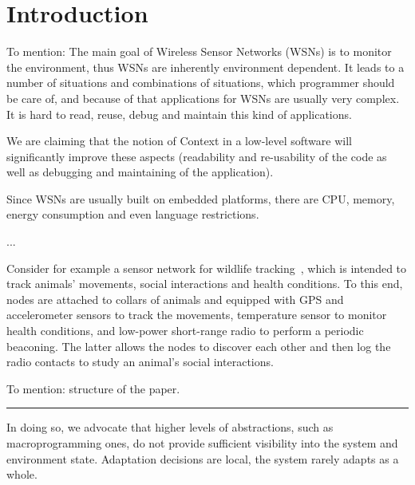 \section{Introduction} To mention: The main goal of Wireless Sensor Networks
(WSNs) is to monitor the environment, thus WSNs are inherently environment
dependent. It leads to a number of situations and combinations of situations,
which programmer should be care of, and because of that applications for WSNs
are usually very complex. It is hard to read, reuse, debug and maintain this
kind of applications.

We are claiming that the notion of Context in a low-level software will
significantly improve these aspects (readability and re-usability of the code
as well as debugging and maintaining of the application).

Since WSNs are usually built on embedded platforms, there are CPU, memory,
energy consumption and even language restrictions.

...

Consider for example a sensor network for wildlife tracking~\cite{pasztor10},
which is intended to track animals' movements, social interactions and health
conditions. To this end, nodes are attached to collars of animals and equipped
with GPS and accelerometer sensors to track the movements, temperature sensor
to monitor health conditions, and low-power short-range radio to perform a
periodic beaconing. The latter allows the nodes to discover each other and then
log the radio contacts to study an animal's social interactions.

To mention: structure of the paper.

\hrule In doing so, we advocate that higher levels of abstractions,
such as macroprogramming ones, do not provide sufficient visibility
into the system and environment state. Adaptation decisions are local,
the system rarely adapts as a whole.
